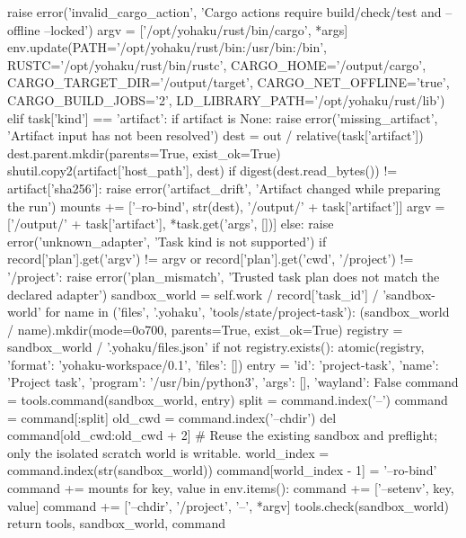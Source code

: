                 raise error('invalid_cargo_action', 'Cargo actions require build/check/test and --offline --locked')
            argv = ['/opt/yohaku/rust/bin/cargo', *args]
            env.update(PATH='/opt/yohaku/rust/bin:/usr/bin:/bin', RUSTC='/opt/yohaku/rust/bin/rustc',
                       CARGO_HOME='/output/cargo', CARGO_TARGET_DIR='/output/target', CARGO_NET_OFFLINE='true',
                       CARGO_BUILD_JOBS='2', LD_LIBRARY_PATH='/opt/yohaku/rust/lib')
        elif task['kind'] == 'artifact':
            if artifact is None:
                raise error('missing_artifact', 'Artifact input has not been resolved')
            dest = out / relative(task['artifact'])
            dest.parent.mkdir(parents=True, exist_ok=True)
            shutil.copy2(artifact['host_path'], dest)
            if digest(dest.read_bytes()) != artifact['sha256']:
                raise error('artifact_drift', 'Artifact changed while preparing the run')
            mounts += ['--ro-bind', str(dest), '/output/' + task['artifact']]
            argv = ['/output/' + task['artifact'], *task.get('args', [])]
        else:
            raise error('unknown_adapter', 'Task kind is not supported')
        if record['plan'].get('argv') != argv or record['plan'].get('cwd', '/project') != '/project':
            raise error('plan_mismatch', 'Trusted task plan does not match the declared adapter')
        sandbox_world = self.work / record['task_id'] / 'sandbox-world'
        for name in ('files', '.yohaku', 'tools/state/project-task'):
            (sandbox_world / name).mkdir(mode=0o700, parents=True, exist_ok=True)
        registry = sandbox_world / '.yohaku/files.json'
        if not registry.exists():
            atomic(registry, {'format': 'yohaku-workspace/0.1', 'files': []})
        entry = {'id': 'project-task', 'name': 'Project task', 'program': '/usr/bin/python3', 'args': [], 'wayland': False}
        command = tools.command(sandbox_world, entry)
        split = command.index('--')
        command = command[:split]
        old_cwd = command.index('--chdir')
        del command[old_cwd:old_cwd + 2]
        # Reuse the existing sandbox and preflight; only the isolated scratch world is writable.
        world_index = command.index(str(sandbox_world))
        command[world_index - 1] = '--ro-bind'
        command += mounts
        for key, value in env.items():
            command += ['--setenv', key, value]
        command += ['--chdir', '/project', '--', *argv]
        tools.check(sandbox_world)
        return tools, sandbox_world, command


